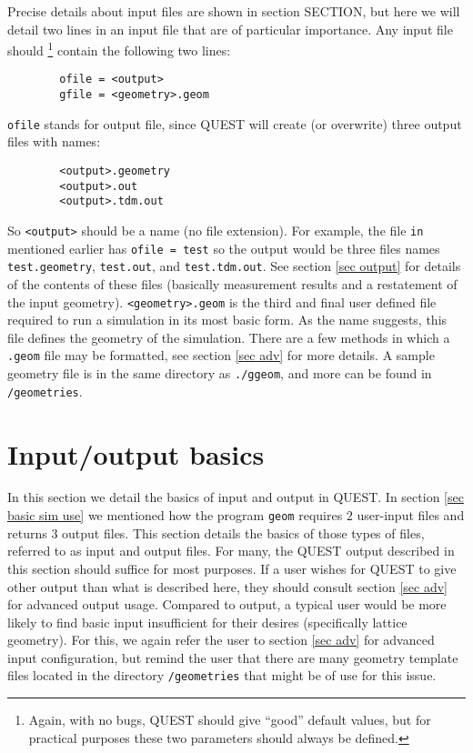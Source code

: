 \documentclass[12pt]{article}
\begin{document}
        Precise details about input files are shown in section SECTION, but here we will detail two lines in an input file that are of particular importance.
        Any input file should \footnote{Again, with no bugs, QUEST should give ``good'' default values, but for practical purposes these two parameters should always be defined.} contain the following two lines:
        \begin{verbatim}
        ofile = <output>
        gfile = <geometry>.geom
        \end{verbatim}
        \texttt{ofile} stands for output file, since QUEST will create (or overwrite) three output files with names:
        \begin{verbatim}
        <output>.geometry
        <output>.out
        <output>.tdm.out
        \end{verbatim}
        So \texttt{<output>} should be a name (no file extension).
        For example, the file \texttt{in} mentioned earlier has \texttt{ofile = test} so the output would be three files names \texttt{test.geometry}, \texttt{test.out}, and \texttt{test.tdm.out}.
        See section \ref{sec output} for details of the contents of these files (basically measurement results and a restatement of the input geometry).
        \texttt{<geometry>.geom} is the third and final user defined file required to run a simulation in its most basic form.
        As the name suggests, this file defines the geometry of the simulation.
        There are a few methods in which a \texttt{.geom} file may be formatted, see section \ref{sec adv} for more details.
        A sample geometry file is in the same directory as \texttt{./ggeom}, and more can be found in \texttt{/geometries}.









\section{Input/output basics}
    In this section we detail the basics of input and output in QUEST.
    In section \ref{sec basic sim use} we mentioned how the program \texttt{geom} requires $2$ user-input files and returns $3$ output files.
    This section details the basics of those types of files, referred to as input and output files.
    For many, the QUEST output described in this section should suffice for most purposes.
    If a user wishes for QUEST to give other output than what is described here, they should consult section \ref{sec adv} for advanced output usage.
    Compared to output, a typical user would be more likely to find basic input insufficient for their desires (specifically lattice geometry).
    For this, we again refer the user to section \ref{sec adv} for advanced input configuration, but remind the user that there are many geometry template files located in the directory \texttt{/geometries} that might be of use for this issue. 
\end{document}
